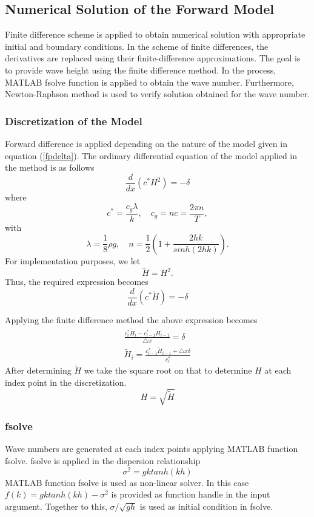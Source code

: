 \subsection{Numerical Solution of the Forward Model}

Finite difference scheme is applied to obtain numerical solution with appropriate initial and boundary conditions. In the scheme of finite differences, the derivatives are replaced using their finite-difference approximations. The goal is to provide wave height using the finite difference method. In the process, MATLAB fsolve function is applied to obtain the wave number. Furthermore, Newton-Raphson method is used to verify solution obtained for the  wave number.
\subsubsection{Discretization of the Model}
Forward difference is applied depending on the nature of the model given in equation (\ref{fpdelta}).
The ordinary differential equation of the model applied in the method is as follows
\begin{equation}
\frac{d}{dx}\left( c^{*}H^{2}\right)=-\delta
\end{equation}
where 
$$c^{*} = \frac{c_{g}\lambda}{k},\quad c_{g} = nc =\frac{2\pi n}{T},$$
with 
$$\lambda = \frac{1}{8}\rho g, \quad n = \frac{1}{2}\left(1+\frac{2hk}{sinh(2hk)}\right).$$
For implementation purposes, we let
\begin{equation*}
\tilde{H}=H^{2}.
\end{equation*}
Thus, the required expression becomes 
\begin{equation*}
\frac{d}{dx}\left( c^{*}\tilde{H}\right)=-\delta
\end{equation*}

Applying the finite difference method the above expression becomes
\begin{eqnarray*}
\frac{c_{i}^{*}\tilde{H}_{i}-c_{i-1}^{*}\tilde{H}_{i-1}}{\triangle x}= \delta
\\ \tilde{H}_{i}=\frac{c_{i-1}^{*}\tilde{H}_{i-1}+\triangle x \delta}{c_{i}^{*}}
\end{eqnarray*}
After determining ${\tilde{H}}$ we take the square root on that to determine ${H}$ at each index point in the discretization.
\begin{equation*}
H=\sqrt{\tilde{H}}
\end{equation*}
\subsubsection*{fsolve}
Wave numbers are generated at each index points applying MATLAB function fsolve. fsolve is applied in the  dispersion relationship
\begin{equation*}
\sigma^{2}=gk tanh(kh)
\end{equation*} 
MATLAB function fsolve is used as non-linear solver. In this case ${f(k)=gk tanh(kh)-\sigma^{2}}$ is provided as function handle in the input argument. Together to this,     ${\sigma/\sqrt{gh}}$ is used as initial condition in fsolve.
